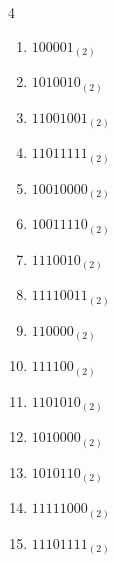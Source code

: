 \begin{multicols}{4}
\begin{enumerate}
        \phantom{$=225$}

  \item $100001_{(2)}$

        \phantom{$=33$}

\columnbreak %

  \item $1010010_{(2)}$

        \phantom{$=82$}

  \item $11001001_{(2)}$

        \phantom{$=201$}

  \item $11011111_{(2)}$

        \phantom{$=223$}

  \item $10010000_{(2)}$

        \phantom{$=144$}

  \item $10011110_{(2)}$

        \phantom{$=158$}

  \item $1110010_{(2)}$

        \phantom{$=114$}

  \item $11110011_{(2)}$

        \phantom{$=243$}

  \item $110000_{(2)}$

        \phantom{$=48$}

  \item $111100_{(2)}$

        \phantom{$=60$}

  \item $1101010_{(2)}$

        \phantom{$=106$}

  \item $1010000_{(2)}$

        \phantom{$=80$}

  \item $1010110_{(2)}$

        \phantom{$=86$}

  \item $11111000_{(2)}$

        \phantom{$=248$}

  \item $11101111_{(2)}$


\end{enumerate}
\end{multicols}
